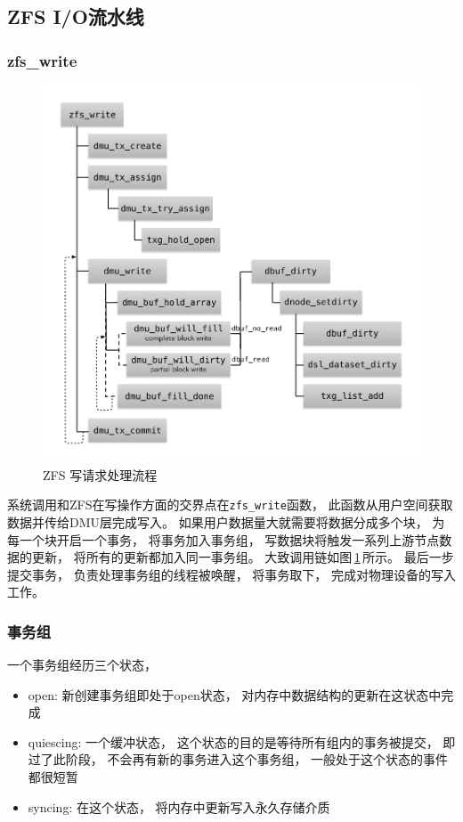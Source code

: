 \subsection{ZFS I/O流水线}
\subsubsection{zfs\_write}
\begin{figure}[!h]
  \centering
  \includegraphics[scale=0.85]{fig/zfs_write.pdf}
  \caption{ZFS 写请求处理流程}\label{fig:zfs_write}
\end{figure}

系统调用和ZFS在写操作方面的交界点在\verb|zfs_write|函数，
此函数从用户空间获取数据并传给DMU层完成写入。
如果用户数据量大就需要将数据分成多个块，
为每一个块开启一个事务，
将事务加入事务组，
写数据块将触发一系列上游节点数据的更新，
将所有的更新都加入同一事务组。
大致调用链如图\,\ref{fig:zfs_write}\,所示。
最后一步提交事务，
负责处理事务组的线程被唤醒，
将事务取下，
完成对物理设备的写入工作。

\subsubsection{事务组}
一个事务组经历三个状态，
\begin{itemize}
  \item open: 新创建事务组即处于open状态，
    对内存中数据结构的更新在这状态中完成
  \item quiescing: 一个缓冲状态，
    这个状态的目的是等待所有组内的事务被提交，
    即过了此阶段，
    不会再有新的事务进入这个事务组，
    一般处于这个状态的事件都很短暂
  \item syncing: 在这个状态，
    将内存中更新写入永久存储介质
\end{itemize}

